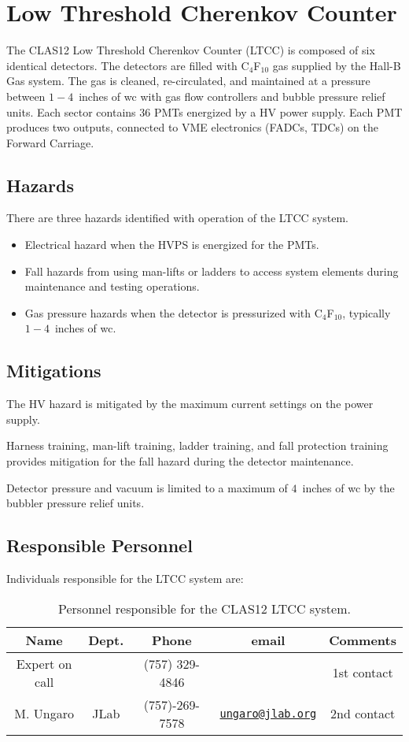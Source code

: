 \section{Low Threshold Cherenkov Counter}

The CLAS12 Low Threshold Cherenkov Counter (LTCC) is composed of six identical detectors. 
The detectors are filled with C$_4$F$_{10}$ gas supplied by the Hall-B Gas system. The gas 
is cleaned, re-circulated, and maintained at a pressure between $1 - 4$~inches of wc with 
gas flow controllers and bubble pressure relief units. Each sector contains 36 PMTs energized 
by a HV power supply. Each PMT produces two outputs, connected to VME electronics (FADCs, 
TDCs) on the Forward Carriage.

\subsection{Hazards} 

There are three hazards identified with operation of the LTCC system. 
\begin{itemize}
\item Electrical hazard when the HVPS is energized for the PMTs.
\item Fall hazards from using man-lifts or ladders to access system elements during 
maintenance and testing operations. 
\item Gas pressure hazards when the detector is pressurized with C$_4$F$_{10}$, typically 
$1 -4$~inches of wc.
\end{itemize}

\subsection{Mitigations}

The HV hazard is mitigated by the maximum current settings on the power supply.

Harness training, man-lift training, ladder training, and fall protection training provides 
mitigation for the fall hazard during the detector maintenance.

Detector pressure and vacuum is limited to a maximum of $4$~inches of wc by the bubbler 
pressure relief units.

\subsection{Responsible Personnel}

Individuals responsible for the LTCC system are:

\begin{table}[!htb]
\centering
\begin{tabular}{|c|c|c|c|c|} \hline
Name&Dept.&Phone&email&Comments \\ \hline
Expert on call& &(757) 329-4846&& 1st contact \\ \hline
M. Ungaro&JLab&(757)-269-7578&\href{mailto:ungaro@jlab.org}{\nolinkurl{ungaro@jlab.org}}&2nd contact \\ \hline
 \end{tabular}
\caption{Personnel responsible for the CLAS12 LTCC system.} 
\label{tb:ltcc}
\end{table}


